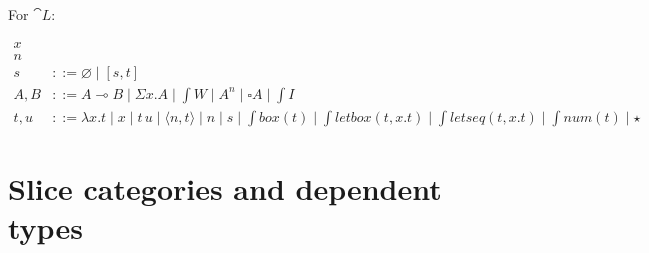 For $\cat L$:

\begin{align}
  x  \tag{variables}                                                                                                                                                                               \\
  n \tag{finite natural numbers, word size}                                                                                                                                                        \\
  s    & ::= \varnothing \mid [s, t] \tag{sequences}                                                                                                                                               \\
  A, B & ::= A \multimap B \mid \Sigma x . A \mid \int{W} \mid A ^n \mid \square A \mid \int{I} \tag{types}                                                                                        \\
  t, u & ::= \lambda x . t \mid x \mid t\,u \mid \langle n, t \rangle \mid n \mid s \mid \int{box}(t) \mid \int{letbox}(t, x.t) \mid \int{letseq}(t, x.t) \mid \int{num}(t) \mid \star \tag{terms}
\end{align}

\section{Slice categories and dependent types}

